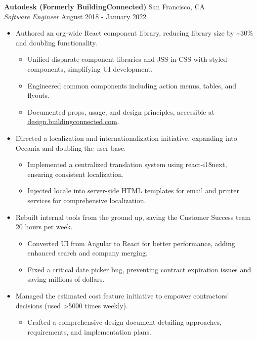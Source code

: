 \documentclass[a4paper]{article}
\begin{document}
\textbf{Autodesk (Formerly BuildingConnected)} \hfill San Francisco, CA\\
\textit{Software Engineer} \hfill August 2018 - January 2022\\
\vspace{-1mm}
\begin{itemize} \itemsep .5pt
    \item Authored an org-wide React component library, reducing library size by \textasciitilde{}30\% and doubling functionality.
    \begin{itemize} \itemsep .5pt
        \item Unified disparate component libraries and JSS-in-CSS with styled-components, simplifying UI development.
        \item Engineered common components including action menus, tables, and flyouts.
        \item Documented props, usage, and design principles, accessible at \href{https://design.buildingconnected.com/}{\underline{design.buildingconnected.com}}.
    \end{itemize}
    \item Directed a localization and internationalization initiative, expanding into Oceania and doubling the user base.
    \begin{itemize} \itemsep .5pt
        \item Implemented a centralized translation system using react-i18next, ensuring consistent localization.
        \item Injected locale into server-side HTML templates for email and printer services for comprehensive localization.
    \end{itemize}
    \item Rebuilt internal tools from the ground up, saving the Customer Success team 20 hours per week.
    \begin{itemize} \itemsep .5pt
        \item Converted UI from Angular to React for better performance, adding enhanced search and company merging.
        \item Fixed a critical date picker bug, preventing contract expiration issues and saving millions of dollars.
    \end{itemize}
    \item Managed the estimated cost feature initiative to empower contractors' decisions (used >5000 times weekly).
    \begin{itemize} \itemsep .5pt
        \item Crafted a comprehensive design document detailing approaches, requirements, and implementation plans.

\end{itemize}
\end{itemize}
\end{document}
